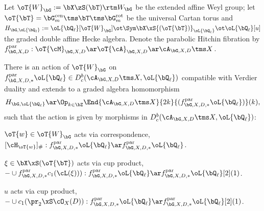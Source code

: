 \documentclass[a4paper, twoside]{article}
\begin{document}

\begin{stp}
	Let $\oT{W}_{\bG}:=\bX\zS(\bT)\rtm W_{\bG}$ be the extended affine Weyl group; let $\oT{\bT}=\bG_{m}^{\text{cen}}\tms\bT\tms\bG_{m}^{\text{rot}}$ be the universal Cartan torus and $H_{\bG,\oL{\bQ_{\ell}}}:=\oL{\bQ_{\ell}}[\oT{W}_{\bG}]\ot\Sym\bX\xS{(\oT{\bT})}_{\oL{\bQ_{\ell}}}\ot\oL{\bQ_{\ell}}[u]$ the graded double affine Hecke algebra. Denote the parabolic Hitchin fibration by $f^{\text{par}}_{\bG,X,D}:\oT{\cM}_{\bG,X,D}\ar\oT{\cA}_{\bG,X,D}\ar\cA_{\bG,X,D}\tms X$.
\end{stp}

\begin{thm}
	There is an action of $\oT{W}_{\bG}$ on $f^{\text{par}}_{\bG,X,D,*}\oL{\bQ_{\ell}}\in D_{c}^{b}(\cA_{\bG,X,D}\tms X,\oL{\bQ_{\ell}})$ compatible with Verdier duality and extends to a graded algebra homomorphism
	\[
		H_{\bG,\oL{\bQ_{\ell}}}\ar\Op_{k\in\bZ}\End{\cA_{\bG,X,D}\tms X}{2k}{(f^{\text{par}}_{\bG,X,D,*}\oL{\bQ_{\ell}})}(k),
	\]
	such that the action is given by morphisms in $D_{c}^{b}(\cA_{\bG,X,D}\tms X, \oL{\bQ_{\ell}})$:
	\begin{itm}
		\item $\oT{w}\in\oT{W}_{\bG}$ acts via correspondence, $[\cH_{\oT{w}}]_{\#}:f^{\text{par}}_{\bG,X,D,*}\oL{\bQ_{\ell}}\ar f^{\text{par}}_{\bG,X,D,*}\oL{\bQ_{\ell}}$.
		\item $\xi\in\bX\xS(\oT{\bT})$ acts via cup product, $-\cup f_{\bG,X,D,*}^{\text{par}}c_{1}(\cL(\xi))):f^{\text{par}}_{\bG,X,D,*}\oL{\bQ_{\ell}}\ar f^{\text{par}}_{\bG,X,D,*}\oL{\bQ_{\ell}}[2](1)$.
		\item $u$ acts via cup product, $-\cup c_{1}(\pr_{2}\xS\cO_{X}(D)):f^{\text{par}}_{\bG,X,D,*}\oL{\bQ_{\ell}}\ar f^{\text{par}}_{\bG,X,D,*}\oL{\bQ_{\ell}}[2](1)$.
	\end{itm}
\end{thm}

\end{document}

